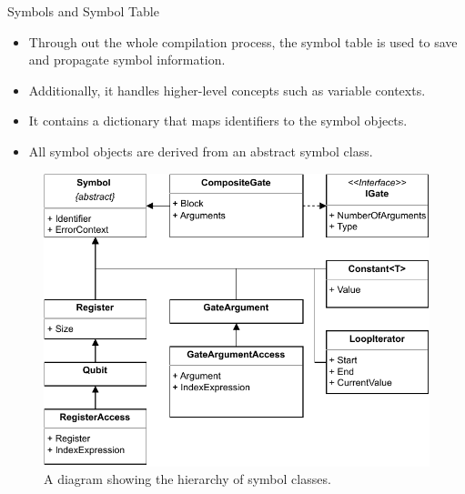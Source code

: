 \begin{frame}{Symbols and Symbol Table}
    \begin{minipage}{.45\textwidth}
        \begin{itemize}
            \item Through out the whole compilation process, the symbol table is used to save and propagate symbol information.
            \item Additionally, it handles higher-level concepts such as variable contexts.
            \item It contains a dictionary that maps identifiers to the symbol objects.
            \item All symbol objects are derived from an abstract symbol class.
        \end{itemize}    
    \end{minipage}
    \begin{minipage}{.50\textwidth}
        \centering
        \begin{figure}[htp]
            \centering
            \includegraphics[]{../figures/drawio/slides/uml_symbols.pdf}
            \caption{A diagram showing the hierarchy of symbol classes.}
        \end{figure}
    \end{minipage}
\end{frame}

